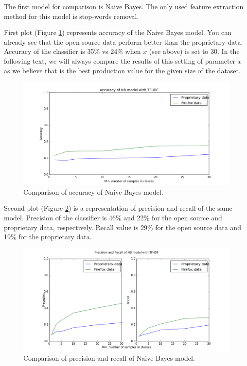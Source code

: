 The first model for comparison is Naive Bayes. The only used feature extraction method for this model is stop-words removal.

First plot (Figure \ref{fig:results.datasets.nb_accuracy}) represents accuracy of the Naive Bayes model. You can already see that the open source data perform better than the proprietary data. Accuracy of the classifier is 35\% vs 24\% when $x$ (see above) is set to 30. In the following text, we will always compare the results of this setting of parameter $x$ as we believe that is the best production value for the given size of the dataset.

\begin{figure}[htbp]
    \centering
        \includegraphics[width=\textwidth]{./images/prop_vs_os/nb_accuracy.png}
    \caption{Comparison of accuracy of Naive Bayes model.}
    \label{fig:results.datasets.nb_accuracy}
\end{figure}

Second plot (Figure \ref{fig:results.datasets.nb_pr}) is a representation of precision and recall of the same model. Precision of the classifier is 46\% and 22\% for the open source and proprietary data, respectively. Recall value is 29\% for the open source data and 19\% for the proprietary data.

\begin{figure}[htbp]
    \centering
        \includegraphics[width=\textwidth]{./images/prop_vs_os/nb_precision_and_recall.png}
    \caption{Comparison of precision and recall of Naive Bayes model.}
    \label{fig:results.datasets.nb_pr}
\end{figure}

